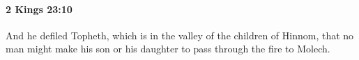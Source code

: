 
		\paragraph{2 Kings 23:10} %
			\label{2KINGS-23-10}

			And he defiled Topheth, which is in the valley of the children of Hinnom, that no man might make his son or his daughter to pass through the fire to Molech.


